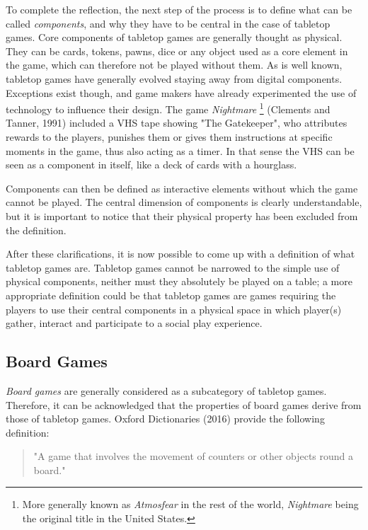 To complete the reflection, the next step of the process is to define what can be called \textit{components}, and why they have to be central in the case of tabletop games. 
Core components of tabletop games are generally thought as physical. They can be cards, tokens, pawns, dice or any object used as a core element in the game, which can therefore not be played without them. As is well known, tabletop games have generally evolved staying away from digital components. 
Exceptions exist though, and game makers have already experimented the use of technology to influence their design. The game \textit{Nightmare}
\footnote{More generally known as \textit{Atmosfear} in the rest of the world, \textit{Nightmare} being the original title in the United States.}
(Clements and Tanner, 1991)\cite{game:atmo} included a VHS tape showing "The Gatekeeper", who attributes rewards to the players, punishes them or gives them instructions at specific moments in the game, thus also acting as a timer. In that sense the VHS can be seen as a component in itself, like a deck of cards with a hourglass.

Components can then be defined as interactive elements without which the game cannot be played. The central dimension of components is clearly understandable, but it is important to notice that their physical property has been excluded from the definition.

After these clarifications, it is now possible to come up with a definition of what tabletop games are. Tabletop games cannot be narrowed to the simple use of physical components, neither must they absolutely be played on a table; a more appropriate definition could be that tabletop games are games requiring the players to use their central components in a physical space in which player(s) gather, interact and participate to a social play experience. 

\subsection{Board Games}
\textit{Board games} are generally considered as a subcategory of tabletop games. Therefore, it can be acknowledged that the properties of board games derive from those of tabletop games. Oxford Dictionaries (2016)\cite{web:oxford} provide the following definition:

\begin{quotation}
"A game that involves the movement of counters or other objects round a board."
\end{quotation}

